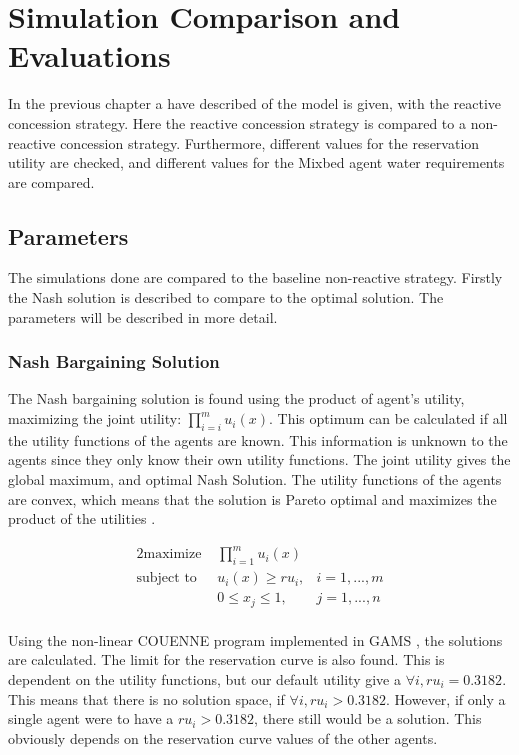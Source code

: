 \chapter{Simulation Comparison and Evaluations}
\label{ch:eval}
In the previous chapter a have described of the model is given, with the reactive concession strategy. Here the reactive concession strategy is compared to a non-reactive concession strategy. Furthermore, different values for the reservation utility are checked, and different values for the Mixbed agent water requirements are compared. 

\section{Parameters}
The simulations done are compared to the baseline non-reactive strategy. Firstly the Nash solution is described to compare to the optimal solution. The parameters will be described in more detail.

\subsection{Nash Bargaining Solution}
The Nash bargaining solution is found using the product of agent's utility, maximizing the joint utility: $\prod_{i=i}^{m}u_i(x).$ This optimum can be calculated if all the utility functions of the agents are known. This information is unknown to the agents since they only know their own utility functions. The joint utility gives the global maximum, and optimal Nash Solution. The utility functions of the agents are convex, which means that the solution is Pareto optimal and maximizes the product of the utilities \citep{nash1950bargaining, roth1977individual, lensberg1988stability}. 

\begin{alignat*}{2}
\text{maximize }   	& \prod_{i=1}^m u_i(x)  \\
\text{subject to \ } 	& u_i(x) \geq ru_i, & i = 1,...,m\\
& 0\leq x_j\leq 1, & j = 1,...,n\\
\end{alignat*}

Using the non-linear COUENNE program \citep{belotti2013mixed} implemented in GAMS \citep{GamsSoftware2013}, the solutions are calculated. The limit for the reservation curve is also found. This is dependent on the utility functions, but our default utility give a $\forall i,  ru_i = 0.3182$. This means that there is no solution space, if $\forall i, ru_i > 0.3182$. However, if only a single agent were to have a $ru_i > 0.3182$, there still would be a solution. This obviously depends on the reservation curve values of the other agents.


